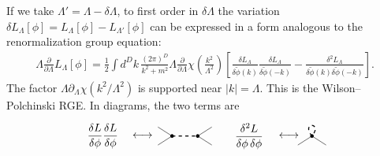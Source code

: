 If we take \(\Lambda'=\Lambda-\delta\Lambda\), to first order in
\(\delta\Lambda\) the variation
\(\delta L_\Lambda[\phi]=L_\Lambda[\phi]-L_{\Lambda'}[\phi]\) can be
expressed in a form analogous to the renormalization group equation:
\[
\begin{aligned}
  \Lambda\frac{\partial}{\partial\Lambda}L_\Lambda[\phi]
  =
  \frac12\int d^Dk\,
  \frac{(2\pi)^D}{k^2+m^2}
  \Lambda\frac{\partial}{\partial\Lambda}
  \chi\!\left(\frac{k^2}{\Lambda^2}\right)
  \left[
    \frac{\delta L_\Lambda}{\delta\widetilde\phi(k)}
    \frac{\delta L_\Lambda}{\delta\widetilde\phi(-k)}
    -
    \frac{\delta^2L_\Lambda}
    {\delta\widetilde\phi(k)\delta\widetilde\phi(-k)}
  \right].
\end{aligned}
\]
The factor
\(\Lambda\partial_\Lambda\chi(k^2/\Lambda^2)\) is supported near
\(|k|=\Lambda\).  This is the Wilson--Polchinski RGE.  In diagrams, the two
terms are
\[
\begin{tikzpicture}[>=Stealth,scale=0.82,baseline=(current bounding box.center)]
  \node at (-2.7,0) {\(\displaystyle
    \frac{\delta L}{\delta\phi}
    \frac{\delta L}{\delta\phi}\)};
  \node at (-1.15,0) {\(\longleftrightarrow\)};
  \fill (0,0) circle (2pt);
  \fill (1.0,0) circle (2pt);
  \draw[dashed,line width=.9pt] (0,0)--(1.0,0);
  \draw (-.55,.35)--(0,0)--(-.55,-.35);
  \draw (1.55,.35)--(1.0,0)--(1.55,-.35);
  \node at (2.15,0) {\(\qquad\)};
  \node at (3.0,0) {\(\displaystyle
    \frac{\delta^2 L}{\delta\phi\,\delta\phi}\)};
  \node at (4.55,0) {\(\longleftrightarrow\)};
  \fill (5.45,0) circle (2pt);
  \draw[dashed,line width=.9pt] (5.45,0) .. controls (5.0,.55) and (5.9,.55) .. (5.45,0);
  \draw (5.45,0)--(4.9,-.35);
  \draw (5.45,0)--(6.0,-.35);
\end{tikzpicture}
\]

